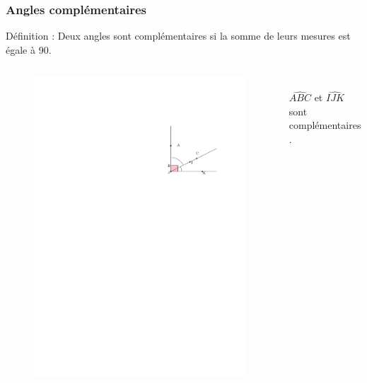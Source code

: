 \documentclass{beamer}
\begin{document}
\begin{frame}
  \frametitle{Angles complémentaires}
  \begin{alertblock}{Définition :}	
    Deux angles sont complémentaires si la somme de leurs mesures est égale à 90.
  \end{alertblock}
  \begin{columns}[t]
    \begin{column}{5cm}
      \begin{figure}[H]
        \centering
        \includegraphics[width=0.8\linewidth]{5x10-angles/sources/complementaires.pdf}
      \end{figure}
    \end{column}
    \begin{column}{5cm}
      \vspace{1cm}\\
      $\widehat{ABC}$ et $\widehat{IJK}$ sont complémentaires.  
    \end{column}
  \end{columns}    
\end{frame}
\end{document}
